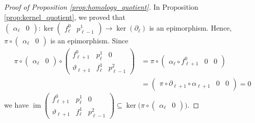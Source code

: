 \documentclass[english,a4paper,nolineno,cleveref]{socg-lipics-v2021}
\DeclareMathOperator{\im}{im}
\begin{document}
\begin{proof}[Proof of Proposition \ref{prop:homology_quotient}]
In Proposition \ref{prop:kernel_quotient}, we proved that $\begin{pmatrix}\alpha_\ell & 0\end{pmatrix}\colon \ker\begin{pmatrix}f^0_\ell & p_{\ell\minus 1}^1\end{pmatrix}\rightarrow \ker(\partial_\ell)$ is an epimorphism. Hence, $\pi\circ\begin{pmatrix}\alpha_\ell & 0\end{pmatrix}$ is an epimorphism. Since
\begin{equation*}
\begin{aligned}
\pi\circ\begin{pmatrix}\alpha_\ell & 0\end{pmatrix}\circ \begin{pmatrix}f^0_{\ell+1} & p^1_{\ell} & 0 \\ \vartheta_{\ell+1} & f^1_\ell & p^2_{\ell\minus 1}\end{pmatrix}&=\pi\circ \begin{pmatrix}\alpha_\ell\circ f^0_{\ell+1} & 0 & 0 \end{pmatrix}\\&=\begin{pmatrix}\pi\circ\partial_{\ell+1}\circ\alpha_{\ell+1} & 0 & 0 \end{pmatrix}=0
\end{aligned}
\end{equation*}
we have $\im\begin{pmatrix}f^0_{\ell+1} & p^1_{\ell} & 0 \\ \vartheta_{\ell+1} & f^1_\ell & p^2_{\ell\minus 1}\end{pmatrix}\subseteq\ker\!\big(\pi\circ\begin{pmatrix}\alpha_\ell & 0\end{pmatrix}\big)$.


\end{proof}
\end{document}
